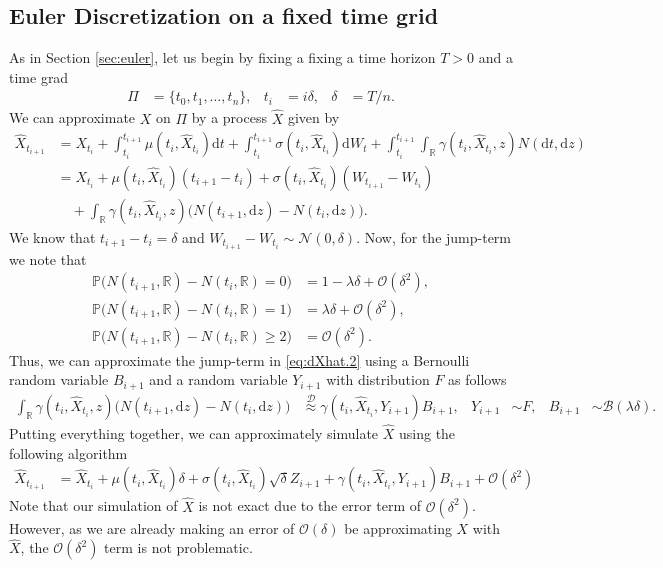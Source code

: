 \documentclass[12pt]{book}
\numberwithin{equation}{chapter}
\theoremstyle{plain}
\numberwithin{theorem}{section}
\theoremstyle{definition}
\numberwithin{exercise}{chapter}
\newcommand{\<}{\langle}
\renewcommand{\>}{\rangle}
\renewcommand{\(}{\left(}
\renewcommand{\)}{\right)}
\renewcommand{\[}{\left[}
\renewcommand{\]}{\right]}
\newcommand\Pb{\mathds{P}}
\newcommand\Rb{\mathds{R}}
\newcommand\Bc{\mathscr{B}}
\newcommand\Dc{\mathscr{D}}
\newcommand\Nc{\mathscr{N}}
\newcommand\Oc{\mathscr{O}}
\newcommand\sig{\sigma}
\newcommand\gam{\gamma}
\newcommand\lam{\lambda}
\newcommand\del{\delta}
\newcommand\Xh{\widehat{X}}
\newcommand\dd{\mathrm{d}}
\begin{document}
\subsection{Euler Discretization on a fixed time grid}
As in Section \ref{sec:euler}, let us begin by fixing a fixing a time horizon $T>0$ and a time grad
\begin{align}
\Pi
	&=	\{ t_0, t_1, \ldots, t_n \} , &
t_i
	&=	i \del , &
\del
	&=	T/n . 
\end{align}
We can approximate $X$ on $\Pi$ by a process $\Xh$ given by
\begin{align}
\Xh_{t_{i+1}}
	&=	X_{t_i} + \int_{t_i}^{t_{i+1}} \mu(t_i,\Xh_{t_i}) \dd t + \int_{t_i}^{t_{i+1}} \sig(t_i,\Xh_{t_i}) \dd W_t 
			+ \int_{t_i}^{t_{i+1}} \int_\Rb \gam(t_i,\Xh_{t_i},z) N(\dd t, \dd z) \\
	&=	X_{t_i} + \mu(t_i,\Xh_{t_i}) (t_{i+1}-t_i) + \sig(t_i,\Xh_{t_i}) (W_{t_{i+1}} - W_{t_i} ) \\ &\quad
			+ \int_\Rb \gam(t_i,\Xh_{t_i},z) \big( N(t_{i+1}, \dd z) - N(t_i,\dd z) \big) . \label{eq:dXhat.2}
\end{align}
We know that $t_{i+1} - t_i = \del$ and $W_{t_{i+1}} - W_{t_i} \sim \Nc(0,\del)$. Now, for the jump-term we note that
\begin{align}
\Pb \Big( N(t_{i+1}, \Rb) - N(t_i, \Rb) = 0 \Big)
	&=	1 - \lam \del + \Oc(\del^2) , \\
\Pb \Big( N(t_{i+1}, \Rb) - N(t_i, \Rb) = 1 \Big)
	&=	\lam \del + \Oc(\del^2) , \\
\Pb \Big( N(t_{i+1}, \Rb) - N(t_i, \Rb) \geq 2 \Big)
	&=	\Oc(\del^2) .
\end{align}
Thus, we can approximate the jump-term in \eqref{eq:dXhat.2} using a Bernoulli random variable $B_{i+1}$ and a random variable $Y_{i+1}$ with distribution $F$ as follows
\begin{align}
\int_\Rb \gam(t_i,\Xh_{t_i},z) \big( N(t_{i+1}, \dd z) - N(t_i,\dd z) \big)
	&\stackrel{\Dc}{\approx} \gam(t_i,\Xh_{t_i},Y_{i+1}) B_{i+1} , &
Y_{i+1}
	&\sim F , &
B_{i+1}
	&\sim \Bc( \lam \del ) .
\end{align}
Putting everything together, we can approximately simulate $\Xh$ using the following algorithm
\begin{align}
\Xh_{t_{i+1}}
	&=	\Xh_{t_i} + \mu(t_i,\Xh_{t_i}) \del + \sig(t_i,\Xh_{t_i}) \sqrt{\del} Z_{i+1} + \gam(t_i,\Xh_{t_i},Y_{i+1}) B_{i+1} + \Oc(\del^2) 
\end{align}
Note that our simulation of $\Xh$ is not exact due to the error term of $\Oc(\del^2)$.  However, as we are already making an error of $\Oc(\del)$ be approximating $X$ with $\Xh$, the $\Oc(\del^2)$ term is not problematic.  
\end{document}
